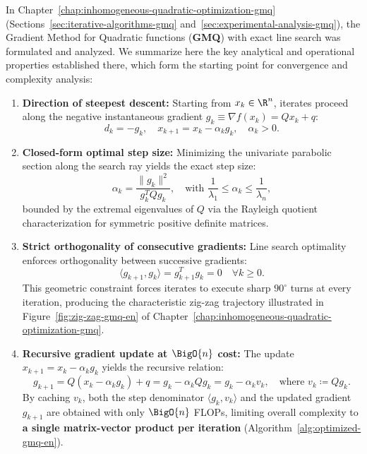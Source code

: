 In Chapter~\ref{chap:inhomogeneous-quadratic-optimization-gmq} (Sections~\ref{sec:iterative-algorithms-gmq} and~\ref{sec:experimental-analysis-gmq}), the Gradient Method for Quadratic functions (\textbf{GMQ}) with exact line search was formulated and analyzed. We summarize here the key analytical and operational properties established there, which form the starting point for convergence and complexity analysis:
\begin{enumerate}
    \item \textbf{Direction of steepest descent:} Starting from $x_k \in \R^n$, iterates proceed along the negative instantaneous gradient $g_k \equiv \nabla f(x_k) = Q x_k + q$:
    \begin{equation}
        d_k = -g_k, \quad x_{k+1} = x_k - \alpha_k g_k, \quad \alpha_k > 0.
    \end{equation}
    \item \textbf{Closed-form optimal step size:} Minimizing the univariate parabolic section along the search ray yields the exact step size:
    \begin{equation}
        \alpha_k = \frac{\|g_k\|^2}{g_k^T Q g_k}, \quad \text{with } \frac{1}{\lambda_1} \le \alpha_k \le \frac{1}{\lambda_n},
        \label{eq:optimal-step-size-en}
    \end{equation}
    bounded by the extremal eigenvalues of $Q$ via the Rayleigh quotient characterization for symmetric positive definite matrices.
    \item \textbf{Strict orthogonality of consecutive gradients:} Line search optimality enforces orthogonality between successive gradients:
    \begin{equation}
        \langle g_{k+1}, g_k \rangle = g_{k+1}^T g_k = 0 \quad \forall k \ge 0.
    \end{equation}
    This geometric constraint forces iterates to execute sharp $90^\circ$ turns at every iteration, producing the characteristic zig-zag trajectory illustrated in Figure~\ref{fig:zig-zag-gmq-en} of Chapter~\ref{chap:inhomogeneous-quadratic-optimization-gmq}.
    \item \textbf{Recursive gradient update at $\BigO{n}$ cost:} The update $x_{k+1} = x_k - \alpha_k g_k$ yields the recursive relation:
    \begin{equation}
        g_{k+1} = Q(x_k - \alpha_k g_k) + q = g_k - \alpha_k Q g_k = g_k - \alpha_k v_k, \quad \text{where } v_k \coloneqq Q g_k.
        \label{eq:gradient-update-en}
    \end{equation}
    By caching $v_k$, both the step denominator $\langle g_k, v_k \rangle$ and the updated gradient $g_{k+1}$ are obtained with only $\BigO{n}$ FLOPs, limiting overall complexity to \textbf{a single matrix-vector product per iteration} (Algorithm~\ref{alg:optimized-gmq-en}).
\end{enumerate}

